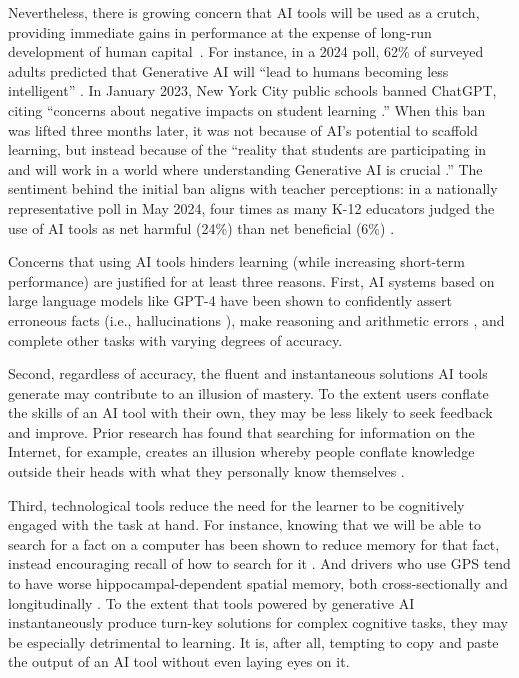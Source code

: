 \documentclass[11pt]{report}
\begin{document}
\begin{mainf}
Nevertheless, there is growing concern that AI tools will be used as a crutch, providing immediate gains in performance at the expense of long-run development of human capital~\cite{hofman2023sports, puntoni2021, borges2024}.
  For instance, in a 2024 poll, 62\% of surveyed adults predicted that Generative AI will ``lead to humans becoming less intelligent'' \cite{hawkins2024between}.
  In January 2023, New York City public schools banned ChatGPT, citing ``concerns about negative impacts on student learning \cite{roose2023}.'' 
  When this ban was lifted three months later, it was not because of AI’s potential to scaffold learning, but instead because of the ``reality that students are participating in and will work in a world where understanding Generative AI is crucial \cite{banks2023}.'' 
  The sentiment behind the initial ban aligns with teacher perceptions: 
  in a nationally representative poll in May 2024, four times as many K-12 educators judged the use of AI tools as net harmful (24\%) than net beneficial (6\%) \cite{lin2024a}. 

Concerns that using AI tools hinders learning (while increasing short-term performance) are justified for at least three reasons. 
  First, AI systems based on large language models like GPT-4 have been shown to confidently assert erroneous facts (i.e., hallucinations \cite{ji2023survey}), make reasoning and arithmetic errors \cite{yuan2023well}, and complete other tasks with varying degrees of accuracy.
  
Second, regardless of accuracy, the fluent and instantaneous solutions AI tools generate may contribute to an illusion of mastery. 
  To the extent users conflate the skills of an AI tool with their own, they may be less likely to seek feedback and improve. 
  Prior research has found that searching for information on the Internet, for example, creates an illusion whereby people conflate knowledge outside their heads with what they personally know themselves \cite{fisher2015}.

Third, technological tools reduce the need for the learner to be cognitively engaged with the task at hand. 
  For instance, knowing that we will be able to search for a fact on a computer has been shown to reduce memory for that fact, instead encouraging recall of how to search for it \cite{sparrow2011}. 
  And drivers who use GPS tend to have worse hippocampal-dependent spatial memory, both cross-sectionally and longitudinally \cite{maguire2000, griesbauer2022london}. 
  To the extent that tools powered by generative AI instantaneously produce turn-key solutions for complex cognitive tasks, they may be especially detrimental to learning. 
  It is, after all, tempting to copy and paste the output of an AI tool without even laying eyes on it.  


\end{mainf}
\end{document}
